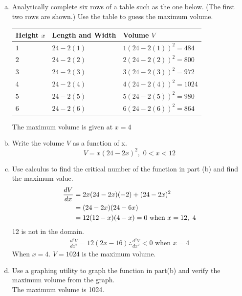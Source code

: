 \documentclass[11pt]{article}
\newcommand*{\set}{\setcounter{equation}{0}}
\begin{document}
\begin{enumerate}[(a)]
    \item Analytically complete six rows of a table such as the one below. (The first two rows are shown.) Use the table to guess the maximum volume.
        \begin{flushleft}
            \begin{table}[h]
                \begin{tabular}{|l|l|l|}
                \hline
                Height $x$ & Length and Width & Volume $V$\\\hline
                $1$ & $24-2(1)$ & $1(24-2(1))^2=484$\\\hline
                $2$ & $24-2(2)$ & $2(24-2(2))^2=800$\\\hline
                $3$ & $24-2(3)$ & $3(24-2(3))^2=972$\\\hline
                $4$ & $24-2(4)$ & $4(24-2(4))^2=1024$\\\hline
                $5$ & $24-2(5)$ & $5(24-2(5))^2=980$\\\hline
                $6$ & $24-2(6)$ & $6(24-2(6))^2=864$\\\hline
                \end{tabular}
            \end{table}
        \end{flushleft}
        The maximum volume is given at $x=4$
    \item Write the volume $V$ as a function of x.\\
        \[V=x(24-2x)^2,\,\, 0<x<12\]
    \item Use calculus to find the critical number of the function in part (b) and find the maximum value.
        \begin{align}
            \set
            \frac{dV}{dx}&=2x(24-2x)(-2)+(24-2x)^2\\
            &=(24-2x)(24-6x)\\
            &=12(12-x)(4-x)=0\,\,\text{when}\,\, x=12,\,\, 4
        \end{align}
        12 is not in the domain.
        \begin{align}
            \frac{d^2V}{dx^2}=12(2x-16)\therefore\frac{d^2V}{dx^2}<0\,\,\text{when}\,\, x=4
        \end{align}
        When $x=4$. $V=1024$ is the maximum volume.
    \item Use a graphing utility to graph the function in part(b) and verify the maximum volume from the graph.\\
        The maximum volume is 1024.
\end{enumerate}
\end{document}
